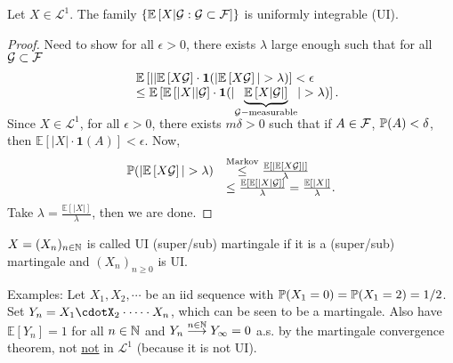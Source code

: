 \documentclass{article}
\begin{document}
\begin{theorem}\label{thm: cond exp UI family}
	Let $ X\in \mathcal{L}^{1}$. The family $ \{ \mathbb{E}\left[ X| \mathcal{G} : \mathcal{G} \subset \mathcal{F}  \right]\}$ is uniformly integrable (UI).

\end{theorem}
\begin{proof}
    Need to show for all $ \epsilon>0$, there exists $ 
    \lambda$ large enough such that for all $ \mathcal{G}\subset \mathcal{F}$
    \[
    \begin{array}{ll}
	    &\mathbb{E}\left[ || \mathbb{E}\left[ X \mathcal{G} \right] \cdot \mathbf{1}(|\mathbb{E}\left[ X \mathcal{ G} \right] |>\lambda)\right] <\epsilon\\
	    &\leq \mathbb{E}\left[  \mathbb{E}\left[ |X| | \mathcal{G} \right]\cdot \mathbf{1}(|\smash{\underbrace{\mathbb{E}\left[ X| \mathcal{G}|\right]}_{ \mathcal{G}-\text{measurable}}}|>\lambda) \right].
    \end{array}
    \]

    Since $ X\in \mathcal{L}^{1} $, for all $ \epsilon>0$, there exists $ m\delta >0$ such that if $ A\in \mathcal{F}$, $ \mathbb{P}(A)<\delta$, then $ \mathbb{E}\left[ |X| \cdot \mathbf{1}(A)\right]<\epsilon$. Now, 
    \[
    \begin{array}{ll}
        \PP(|\mathbb{E}\left[ X \mathcal{G} \right]|>
	\lambda) &\stackrel{\text{Markov}}{\leq} \frac{\mathbb{E}\left[ |\mathbb{E}\left[ X  \mathcal{G} \right]| \right]}{\lambda}\\ 
		 &\leq \frac{\mathbb{E}\left[  \mathbb{E}\left[ |X|  \mathcal{G}\right] \right]
}{\lambda} = \frac{\mathbb{E}\left[ |X| \right]}{\lambda}.
    \end{array}
    \]
    Take $\lambda =  \frac{\mathbb{E}\left[ |X| \right]}{\lambda}$, then we are done.
\end{proof}

\begin{boxdef}\label{def: UI mg}
$ X = (X_{n})_{n\in \mathbb{N}}$ is called UI (super/sub) martingale if it is a (super/sub) martingale and $ (X_{n})_{n\geq 0}$ is UI.
\end{boxdef}


\begin{examplesblock}{Examples:}\label{examples: 4}
	Let $ X_{1}, X_{2}, \cdots$ be an iid sequence with $ \mathbb{P}(X_{1}=0) = \mathbb{P}(X_{1}=2)=1/2$. Set $ Y_{n} = X_{1}\cdotX_{2}\cdot \cdots \cdot X_{n}$, which can be seen to be a martingale. Also have $ \mathbb{E}\left[ Y_{n} \right]=1$ for all $ n\in \mathbb{N}$ and $ Y_{n}\stackrel{n\in \mathbb{N}}{\longrightarrow}Y_{\infty}=0$ a.s. by the martingale convergence theorem, not \underline{not} in $ \mathcal{L}^{1} $ (because it is not UI).
\end{examplesblock}
\end{document}
